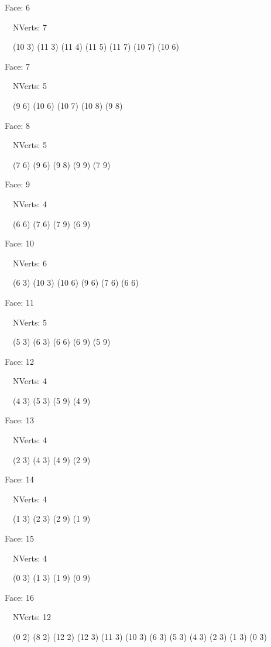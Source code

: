 \documentclass{article}
\begin{document}
{\footnotesize 

Face: 6

\   \    NVerts: 7

 \   \   (10 3) (11 3) (11 4) (11 5) (11 7) (10 7) (10 6)}

{\footnotesize 

Face: 7

\   \    NVerts: 5

 \   \   (9 6) (10 6) (10 7) (10 8) (9 8)}

{\footnotesize 

Face: 8

\   \    NVerts: 5

 \   \   (7 6) (9 6) (9 8) (9 9) (7 9)}

{\footnotesize 

Face: 9

\   \    NVerts: 4

 \   \   (6 6) (7 6) (7 9) (6 9)}

{\footnotesize 

Face: 10

\   \    NVerts: 6

 \   \   (6 3) (10 3) (10 6) (9 6) (7 6) (6 6)}

{\footnotesize 

Face: 11

\   \    NVerts: 5

 \   \   (5 3) (6 3) (6 6) (6 9) (5 9)}

{\footnotesize 

Face: 12

\   \    NVerts: 4

 \   \   (4 3) (5 3) (5 9) (4 9)}

{\footnotesize 

Face: 13

\   \    NVerts: 4

 \   \   (2 3) (4 3) (4 9) (2 9)}

{\footnotesize 

Face: 14

\   \    NVerts: 4

 \   \   (1 3) (2 3) (2 9) (1 9)}

{\footnotesize 

Face: 15

\   \    NVerts: 4

 \   \   (0 3) (1 3) (1 9) (0 9)}

{\footnotesize 

Face: 16

\   \    NVerts: 12

 \   \   (0 2) (8 2) (12 2) (12 3) (11 3) (10 3) (6 3) (5 3) (4 3) (2 3) (1 3) (0 3)}
\end{document}
